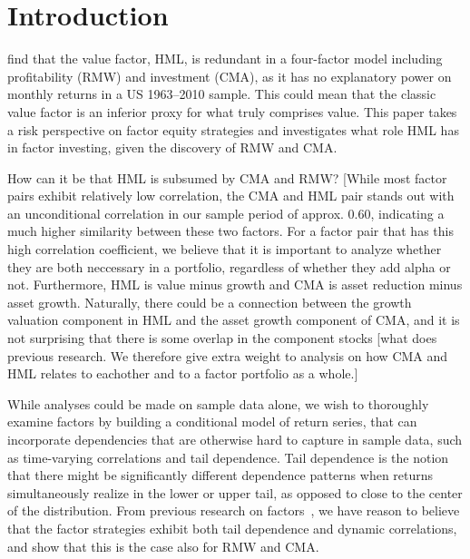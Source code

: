 \section{Introduction}
\textcite{FF2015} find that the value factor, HML, is redundant in a four-factor model including profitability (RMW) and investment (CMA), as it has no explanatory power on monthly returns in a US 1963–2010 sample. This could mean that the classic value factor is an inferior proxy for what truly comprises value. This paper takes a risk perspective on factor equity strategies and investigates what role HML has in factor investing, given the discovery of RMW and CMA. 

How can it be that HML is subsumed by CMA and RMW? [While most factor pairs exhibit relatively low correlation, the CMA and HML pair stands out with an unconditional correlation in our sample period of approx. 0.60, indicating a much higher similarity between these two factors. For a factor pair that has this high correlation coefficient, we believe that it is important to analyze whether they are both neccessary in a portfolio, regardless of whether they add alpha or not. Furthermore, HML is value minus growth and CMA is asset reduction minus asset growth. Naturally, there could be a connection between the growth valuation component in HML and the asset growth component of CMA, and it is not surprising that there is some overlap in the component stocks [what does previous research. We therefore give extra weight to analysis on how CMA and HML relates to eachother and to a factor portfolio as a whole.]

While analyses could be made on sample data alone, we wish to thoroughly examine factors by building a conditional model of return series, that can incorporate dependencies that are otherwise hard to capture in sample data, such as time-varying correlations and tail dependence. Tail dependence is the notion that there might be significantly different dependence patterns when returns simultaneously realize in the lower or upper tail, as opposed to close to the center of the distribution. From previous research on factors~\autocite{ChristoffersenLanglois2013}, we have reason to believe that the factor strategies exhibit both tail dependence and dynamic correlations, and show that this is the case also for RMW and CMA.

